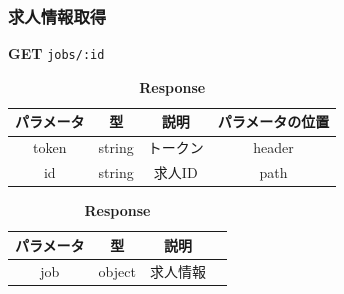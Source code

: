 \subsubsection*{求人情報取得}
\textbf{GET} \texttt{jobs/:id}
\begin{table}[H]
  \begin{minipage}
    {0.5\hsize} \centering \captionsetup{labelformat=empty,labelsep=none} \caption{\textbf{Request}}
    \begin{tabular}{|c|c|c|c|} \hline
      パラメータ & 型      & 説明   & パラメータの位置 \\ \hline \hline
      token & string & トークン & header   \\ \hline
      id    & string & 求人ID & path     \\ \hline
    \end{tabular}
  \end{minipage}
  \begin{minipage}
    {0.5\hsize} \centering \captionsetup{labelformat=empty,labelsep=none} \caption{\textbf{Response}}
    \begin{tabular}{|c|c|c|c|} \hline
      パラメータ & 型      & 説明   \\ \hline \hline
      job   & object & 求人情報 \\ \hline
    \end{tabular}
  \end{minipage}
\end{table}

